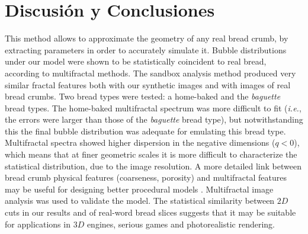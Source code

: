 



\section{Discusi\'on y Conclusiones}
This method allows to approximate the geometry of any real bread crumb, by 
extracting parameters in order to accurately simulate it.
Bubble distributions under our model were shown to be statistically coincident to real bread, according to multifractal methods.
The sandbox analysis method produced very similar fractal features both with our synthetic images and with images of real bread crumbs.
Two bread types were tested: a home-baked and the {\em baguette } bread types.
The home-baked multifractal spectrum was more difficult to fit ({\em i.e.}, the errors were larger than those of the {\em baguette} bread type), but notwithstanding this the final bubble distribution was adequate for emulating this bread type.
Multifractal spectra showed higher dispersion in the negative dimensions ($q < 0$), which means that at finer geometric scales it is more difficult to characterize the statistical distribution, due to the image resolution.
A more detailed link between bread crumb physical features (coarseness, porosity) and multifractal features may be useful for designing better procedural models \cite{Baravalle2012}.
Multifractal image analysis was used to validate the model.
The statistical similarity between $2D$ cuts in our results and of real-word bread slices suggests that it may be suitable for applications in $3D$ engines, serious games \cite{Susi2007} and photorealistic rendering. 


